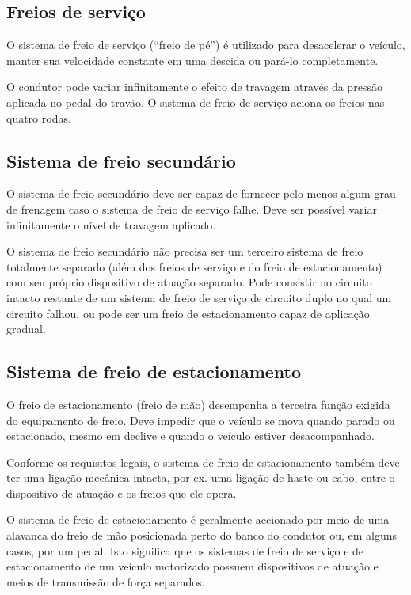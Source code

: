 \subsection{Freios de serviço}

O sistema de freio de serviço (“freio de pé”) é utilizado para desacelerar o veículo, manter sua velocidade constante em uma descida ou pará-lo completamente. 

O condutor pode variar infinitamente o efeito de travagem através da pressão aplicada no pedal do travão. O sistema de freio de serviço aciona os freios nas quatro rodas.

\subsection{Sistema de freio secundário }

O sistema de freio secundário deve ser capaz de fornecer pelo menos algum grau de frenagem caso o sistema de freio de serviço falhe. Deve ser possível variar infinitamente o nível de travagem aplicado. 

O sistema de freio secundário não precisa ser um terceiro sistema de freio totalmente separado (além dos freios de serviço e do freio de estacionamento) com seu próprio dispositivo de atuação separado. Pode consistir no circuito intacto restante de um sistema de freio de serviço de circuito duplo no qual um circuito falhou, ou pode ser um freio de estacionamento capaz de aplicação gradual.


\subsection{Sistema de freio de estacionamento }

O freio de estacionamento (freio de mão) desempenha a terceira função exigida do equipamento de freio. Deve impedir que o veículo se mova quando parado ou estacionado, mesmo em declive e quando o veículo estiver desacompanhado. 

Conforme os requisitos legais, o sistema de freio de estacionamento também deve ter uma ligação mecânica intacta, por ex. uma ligação de haste ou cabo, entre o dispositivo de atuação e os freios que ele opera. 

O sistema de freio de estacionamento é geralmente accionado por meio de uma alavanca do freio de mão posicionada perto do banco do condutor ou, em alguns casos, por um pedal. Isto significa que os sistemas de freio de serviço e de estacionamento de um veículo motorizado possuem dispositivos de atuação e meios de transmissão de força separados. 


